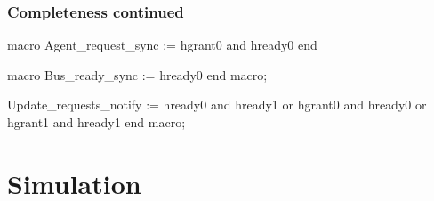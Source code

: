 \documentclass[]{beamer}
\begin{document}
       \begin{frame}[fragile]
         \frametitle{Completeness continued}
       \begin{VHI}
macro Agent_request_sync := hgrant0 and hready0 end

macro Bus_ready_sync := hready0 end macro;



Update_requests_notify :=
hready0 and hready1 or
hgrant0 and hready0 or
hgrant1 and hready1
end macro;

       \end{VHI}
       \end{frame}
  

       \section{Simulation}
\end{document}

